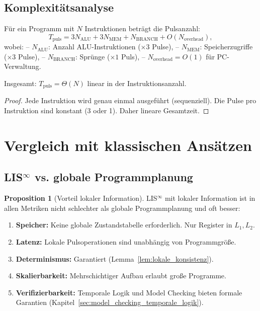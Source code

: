 \documentclass[a4paper,12pt]{article}
\theoremstyle{definition}
\newtheorem{proposition}{Proposition}
\begin{document}
	\subsection{Komplexitätsanalyse}
	
	\begin{theorem}
		\label{thm:complexity}
		Für ein Programm mit $N$ Instruktionen beträgt die Pulsanzahl:
		\[
		T_{\text{puls}} = 3N_{\text{ALU}} + 3N_{\text{MEM}} + N_{\text{BRANCH}} + O(N_{\text{overhead}}),
		\]
		wobei:
		-- $N_{\text{ALU}}$: Anzahl ALU-Instruktionen ($\times 3$ Pulse),
		-- $N_{\text{MEM}}$: Speicherzugriffe ($\times 3$ Pulse),
		-- $N_{\text{BRANCH}}$: Sprünge ($\times 1$ Puls),
		-- $N_{\text{overhead}} = O(1)$ für PC-Verwaltung.
		
		Insgesamt: $T_{\text{puls}} = \Theta(N)$ linear in der Instruktionsanzahl.
	\end{theorem}
	
	\begin{proof}
		Jede Instruktion wird genau einmal ausgeführt (sequenziell). Die Pulse pro Instruktion sind konstant (3 oder 1). Daher lineare Gesamtzeit.
	\end{proof}
	
	\section{Vergleich mit klassischen Ansätzen}
	\label{sec:vergleich_klassisch}
	
	\subsection{LIS$^{\infty}$ vs. globale Programmplanung}
	
	\begin{proposition}[Vorteil lokaler Information]
		LIS$^{\infty}$ mit lokaler Information ist in allen Metriken nicht schlechter als globale Programmplanung und oft besser:
		\begin{enumerate}
			\item \textbf{Speicher:} Keine globale Zustandstabelle erforderlich. Nur Register in $L_1, L_2$.
			\item \textbf{Latenz:} Lokale Pulsoperationen sind unabhängig von Programmgröße.
			\item \textbf{Determinismus:} Garantiert (Lemma~\ref{lem:lokale_konsistenz}).
			\item \textbf{Skalierbarkeit:} Mehrschichtiger Aufbau erlaubt große Programme.
			\item \textbf{Verifizierbarkeit:} Temporale Logik und Model Checking bieten formale Garantien (Kapitel~\ref{sec:model_checking_temporale_logik}).
		\end{enumerate}
	\end{proposition}
	
\end{document}

